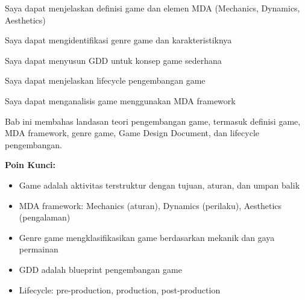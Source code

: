 \documentclass[../main]{subfiles}
\begin{document}

\begin{checklist}
  \item Saya dapat menjelaskan definisi game dan elemen MDA (Mechanics, Dynamics, Aesthetics)
  \item Saya dapat mengidentifikasi genre game dan karakteristiknya
  \item Saya dapat menyusun GDD untuk konsep game sederhana
  \item Saya dapat menjelaskan lifecycle pengembangan game
  \item Saya dapat menganalisis game menggunakan MDA framework
\end{checklist}


\begin{rangkuman}
Bab ini membahas landasan teori pengembangan game, termasuk definisi game, MDA framework, genre game, Game Design Document, dan lifecycle pengembangan.

\textbf{Poin Kunci:}
\begin{itemize}
  \item Game adalah aktivitas terstruktur dengan tujuan, aturan, dan umpan balik
  \item MDA framework: Mechanics (aturan), Dynamics (perilaku), Aesthetics (pengalaman)
  \item Genre game mengklasifikasikan game berdasarkan mekanik dan gaya permainan
  \item GDD adalah blueprint pengembangan game
  \item Lifecycle: pre-production, production, post-production
\end{itemize}
\end{rangkuman}

\ifSubfilesClassLoaded{
  \renewcommand{\bibname}{Daftar Pustaka}
  
  
}{}
\end{document}
